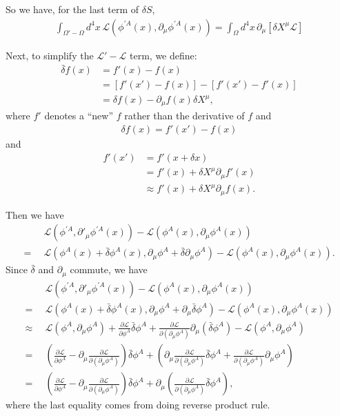 \documentclass[a4paper,11pt]{article}
\numberwithin{equation}{section}
\theoremstyle{definition}
\newcommand{\p}{\partial}
\newcommand{\lag}{\mathcal{L}}
\newcommand{\nn}{\nonumber}
\begin{document}
So we have, for the last term of $\delta S$,
\begin{align}
\int_{\Omega' - \Omega} d^4x\, \lag\left(\phi^{'A}(x), \p_\mu\phi^{'A}(x) \right) = \int_\Omega d^4x\,\p_\mu \left[ \delta X^\mu \lag \right]
\end{align}

Next, to simplify the $\lag'-\lag$ term, we define:
\begin{align}
\bar{\delta} f(x) &= f'(x) - f(x) \nonumber\\
&= \left[ f'(x') - f(x) \right] - \left[f'(x') - f'(x)\right]\nonumber\\
&= \delta f(x) - \p_\mu f(x)\delta X^\mu,
\end{align}
where $f'$ denotes a ``new'' $f$ rather than the derivative of $f$ and
\begin{align}
\delta f(x) = f'(x') - f(x)
\end{align}
and
\begin{align}
f'(x') &= f'(x+\delta x)\nonumber\\
&= f'(x) + \delta X^\mu \p_\mu f'(x)\nonumber\\
&\approx f'(x) + \delta X^\mu \p_\mu f(x).
\end{align}

Then we have
\begin{align}
&\lag\left(\phi^{'A}, \p'_\mu \phi^{'A}(x)\right) - \lag\left(\phi^A(x),\p_\mu\phi^A(x)\right) \nonumber\\
=\,\,\,&\lag\left(\phi^A(x) + \bar{\delta}\phi^A(x), \p_\mu\phi^A + \bar{\delta}\p_\mu\phi^A \right) - \lag\left(\phi^A(x), \p_\mu \phi^A(x)\right).
\end{align}
Since $\bar{\delta}$ and $\p_\mu$ commute, we have
\begin{align}
&\lag\left(\phi^{'A}, \p'_\mu \phi^{'A}(x)\right) - \lag\left(\phi^A(x),\p_\mu\phi^A(x)\right) \nonumber\\
=\,\,\,&\lag\left( \phi^A(x) + \bar{\delta}\phi^A(x), \p_\mu\phi^A + \p_\mu\bar{\delta}\phi^A\right) - \lag\left(\phi^A(x), \p_\mu \phi^A(x)\right)\nonumber\\
\approx\,\,\,& \lag\left(\phi^A, \p_\mu\phi^A\right) + \frac{\p \lag}{\p \phi^A}\bar{\delta}\phi^A + \frac{\p \lag}{\p (\p_\mu \phi^A)}\p_\mu (\bar{\delta}\phi^A) - \lag\left(\phi^A, \p_\mu\phi^A \right) \nn \\
=\,\,\,& \left(\frac{\p \lag }{\p \phi^A} - \p_\mu\frac{\p \lag}{\p( \p_\mu \phi^A) }\right)\bar{\delta}\phi^A + \left(\p_\mu \frac{\p \lag}{\p( \p_\mu \phi^A)}\bar{\delta}\phi^A + \frac{\p \lag}{\p( \p_\mu \phi^A)}\p_\mu\phi^A\right)\nn\\
=\,\,\, & \left(\frac{\p \lag }{\p \phi^A} - \p_\mu\frac{\p \lag}{\p( \p_\mu \phi^A )}\right)\bar{\delta}\phi^A + \p_\mu \left(\frac{\p \lag}{\p( \p_\mu \phi^A)}\bar{\delta}\phi^A\right),
\end{align}
where the last equality comes from doing reverse product rule.\\
\end{document}
